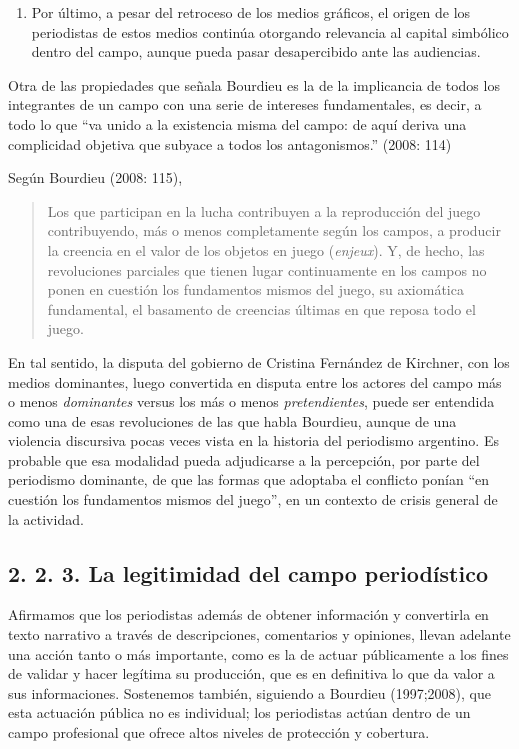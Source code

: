 {\begin{enumerate}
\def\labelenumi{\alph{enumi})}
\setcounter{enumi}{4}
\item
  Por último, a pesar del retroceso de los medios gráficos, el origen de los periodistas de estos medios continúa otorgando relevancia al capital simbólico dentro del campo, aunque pueda pasar desapercibido ante las audiencias.
\end{enumerate}

Otra de las propiedades que señala Bourdieu es la de la implicancia de todos los integrantes de un campo con una serie de intereses fundamentales, es decir, a todo lo que ``va unido a la existencia misma del campo: de aquí deriva una complicidad objetiva que subyace a todos los antagonismos.'' (2008: 114)

Según Bourdieu (2008: 115),

\begin{quote}
Los que participan en la lucha contribuyen a la reproducción del juego contribuyendo, más o menos completamente según los campos, a producir la creencia en el valor de los objetos en juego (\emph{enjeux}). Y, de hecho, las revoluciones parciales que tienen lugar continuamente en los campos no ponen en cuestión los fundamentos mismos del juego, su axiomática fundamental, el basamento de creencias últimas en que reposa todo el juego.
\end{quote}

En tal sentido, la disputa del gobierno de Cristina Fernández de Kirchner, con los medios dominantes, luego convertida en disputa entre los actores del campo más o menos \emph{dominantes} versus los más o menos \emph{pretendientes}, puede ser entendida como una de esas revoluciones de las que habla Bourdieu, aunque de una violencia discursiva pocas veces vista en la historia del periodismo argentino. Es probable que esa modalidad pueda adjudicarse a la percepción, por parte del periodismo dominante, de que las formas que adoptaba el conflicto ponían ``en cuestión los fundamentos mismos del juego'', en un contexto de crisis general de la actividad.

\subsection{2. 2. 3. La legitimidad del campo periodístico}

Afirmamos que los periodistas además de obtener información y convertirla en texto narrativo a través de descripciones, comentarios y opiniones, llevan adelante una acción tanto o más importante, como es la de actuar públicamente a los fines de validar y hacer legítima su producción, que es en definitiva lo que da valor a sus informaciones. Sostenemos también, siguiendo a Bourdieu (1997;2008), que esta actuación pública no es individual; los periodistas actúan dentro de un campo profesional que ofrece altos niveles de protección y cobertura.

}
